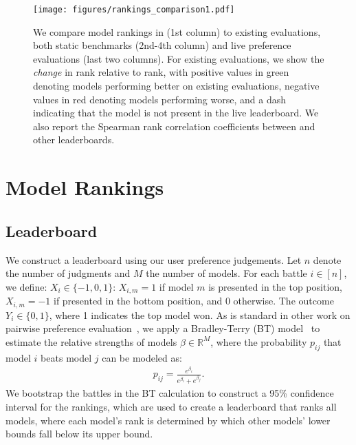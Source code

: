 


\begin{figure}[t]
\centering
\texttt{[image: figures/rankings\_comparison1.pdf]}
\vspace{-0.5cm}
\caption{We compare model rankings in \systemName (1st column) to existing evaluations, both static benchmarks (2nd-4th column) and live preference evaluations (last two columns).
For existing evaluations, we show the \emph{change} in rank relative to \systemName rank, with positive values in green denoting models performing better on existing evaluations, negative values in red denoting models performing worse, and a dash indicating that the model is not present in the live leaderboard. 
We also report the Spearman rank correlation coefficients between \systemName and other leaderboards.
}
\label{fig:leaderboard-correlations}
\vspace{-0.1cm}
\end{figure}



\section{Model Rankings}\label{sec:leaderboard_calculation}


\subsection{\systemName Leaderboard}

We construct a leaderboard using our user preference judgements.
Let $n$ denote the number of judgments and $M$ the number of models. 
For each battle $i \in [n]$, we define: $X_i \in \{-1, 0, 1\}$: $X_{i,m} = 1$ if model $m$ is presented in the top position, $X_{i,m} = -1$ if presented in the bottom position, and 0 otherwise. The outcome $Y_i \in \{0, 1\}$, where 1 indicates the top model won.
As is standard in other work on pairwise preference evaluation~\citep{chiang2024chatbot,lu2024wildvision}, we apply a Bradley-Terry (BT) model~\cite{bradley1952rank} to estimate the relative strengths of models $\beta \in \mathbb{R}^M$, where the probability $p_{ij}$ that model $i$ beats model $j$ can be modeled as:
\begin{align*}
p_{ij} = \frac{e^{\beta_i}}{e^{\beta_i} + e^{\beta_j}}.
\end{align*}
We bootstrap the battles in the BT calculation to construct a 95\% confidence interval for the rankings, which are used to create a leaderboard that ranks all models, where each model's rank is determined by which other models' lower bounds fall below its upper bound.



